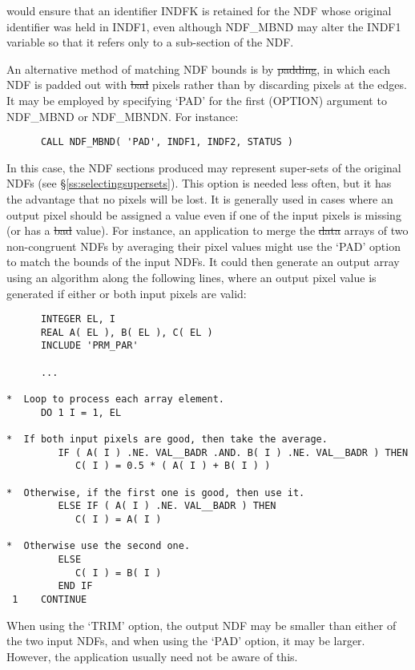 would ensure that an identifier INDFK is retained for the NDF whose original
identifier was held in INDF1, even although NDF\_MBND may alter the INDF1
variable so that it refers only to a sub-section of the NDF.

An alternative method of matching NDF bounds is by \st{padding}, in which 
each NDF is padded out with \st{bad\/} pixels rather than by discarding 
pixels at the edges.
It may be employed by specifying `PAD' for the first (OPTION) argument to
NDF\_MBND or NDF\_MBNDN. 
For instance:

\small
\begin{verbatim}
      CALL NDF_MBND( 'PAD', INDF1, INDF2, STATUS )
\end{verbatim}
\normalsize

In this case, the NDF sections produced may represent super-sets of the
original NDFs (see \S\ref{ss:selectingsupersets}). 
This option is needed less often, but it has the advantage that no pixels
will be lost. 
It is generally used in cases where an output pixel should be assigned a
value even if one of the input pixels is missing (or has a \st{bad\/} value). 
For instance, an application to merge the \st{data\/} arrays of two
non-congruent NDFs by averaging their pixel values might use the `PAD'
option to match the bounds of the input NDFs.
It could then generate an output array using an algorithm along the
following lines, where an output pixel value is generated if either or both
input pixels are valid: 

\small
\begin{verbatim}
      INTEGER EL, I
      REAL A( EL ), B( EL ), C( EL )
      INCLUDE 'PRM_PAR'

      ...

*  Loop to process each array element.
      DO 1 I = 1, EL

*  If both input pixels are good, then take the average.
         IF ( A( I ) .NE. VAL__BADR .AND. B( I ) .NE. VAL__BADR ) THEN
            C( I ) = 0.5 * ( A( I ) + B( I ) )

*  Otherwise, if the first one is good, then use it.
         ELSE IF ( A( I ) .NE. VAL__BADR ) THEN
            C( I ) = A( I )

*  Otherwise use the second one.
         ELSE
            C( I ) = B( I )
         END IF
 1    CONTINUE
\end{verbatim}
\normalsize

When using the `TRIM' option, the output NDF may be smaller than either of
the two input NDFs, and when using the `PAD' option, it may be larger. 
However, the application usually need not be aware of this. 

